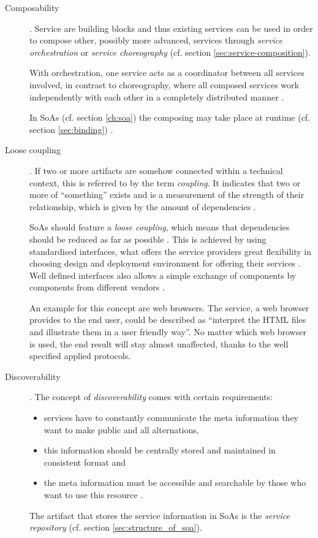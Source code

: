 \begin{description}
\item [Composability]. 
Service are building blocks and thus existing services can be used in order to compose other, possibly more advanced, services through \emph{service orchestration} or \emph{service choreography} (cf. section \ref{sec:service-composition}). 

With orchestration, one service acts as a coordinator between all services involved, in contrast to choreography, where all composed services work independently with each other in a completely distributed manner \cite{opengroup} \cite{arrowhead} \cite{breivold} \cite[p.27]{erl2011}.

In SoAs (cf. section \ref{ch:soa}) the composing may take place at runtime (cf. section \ref{sec:binding}) \cite{breivold}.

\item [Loose coupling].
If two or more artifacts are somehow connected within a technical context, this is referred to by the term \emph{coupling}. It indicates that two or more of ``something'' exists and is a measurement of the strength of their relationship, which is given by the amount of dependencies \cite{erl2008}.

SoAs should feature a \emph{loose coupling}, which means that dependencies should be reduced as far as possible \cite{erl2008}. This is achieved by using standardised interfaces, what offers the service providers great flexibility in choosing design and deployment environment for offering their services \cite{breivold} \cite{arrowhead}. Well defined interfaces also allows a simple exchange of components by components from different vendors \cite{scholz}.

An example for this concept are web browsers. The service, a web browser provides to the end user, could be described as ``interpret the HTML files and illustrate them in a user friendly way''. No matter which web browser is used, the end result will stay almost unaffected, thanks to the well specified applied protocols.

\item [Discoverability]. 
The concept of \emph{discoverability} comes with certain requirements:
	\begin{itemize}
	\item services have to constantly communicate the meta information they want to make public and all alternations,
	\item this information should be centrally stored and maintained in consistent format and
	\item the meta information must be accessible and searchable by those who want to use this resource \cite[ch.12.]{erl2008}.
	\end{itemize}
The artifact that stores the service information in SoAs is the \emph{service repository} (cf. section \ref{sec:structure_of_soa}).


\end{description}
